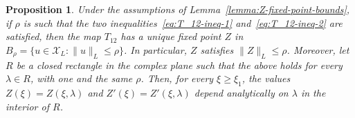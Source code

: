 \documentclass[11pt]{article}
\newcommand{\Space}{\mathcal{X}}
\newtheorem{proposition}[definition]{Proposition}
\begin{document}
\begin{proposition}\label{prop:Z-fixed-point}
  Under the assumptions of Lemma~\ref{lemma:Z-fixed-point-bounds}, if
  \(\rho\) is such that the two inequalities~\eqref{eq:T_12-ineq-1}
  and~\eqref{eq:T_12-ineq-2} are satisfied, then the map \(T_{12}\)
  has a unique fixed point \(Z\) in
  \(B_{\rho} = \{u \in \Space_{L} \colon \|u\|_{L} \leq \rho\}\). In
  particular, \(Z\) satisfies \(\|Z\|_{L} \leq \rho\). Moreover, let
  \(R\) be a closed rectangle in the complex plane such that the above
  holds for every \(\lambda \in R\), with one and the same \(\rho\).
  Then, for every \(\xi \geq \xi_{1}\), the values
  \(Z(\xi) = Z(\xi, \lambda)\) and \(Z'(\xi) = Z'(\xi, \lambda)\)
  depend analytically on \(\lambda\) in the interior of \(R\).
\end{proposition}
\end{document}
